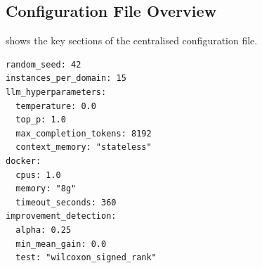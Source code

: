 \subsection{Configuration File Overview}

 shows the key sections of the centralised configuration file.

\begin{lstlisting}[language={}, caption={Key sections of \texttt{experiment\_config.yaml}. All experimental parameters are defined in this single file.}, label={lst:config_yaml}, basicstyle=\footnotesize\ttfamily, numbers=none, frame=single, xleftmargin=0.5cm, xrightmargin=0.5cm, breaklines=true]
random_seed: 42
instances_per_domain: 15
llm_hyperparameters:
  temperature: 0.0
  top_p: 1.0
  max_completion_tokens: 8192
  context_memory: "stateless"
docker:
  cpus: 1.0
  memory: "8g"
  timeout_seconds: 360
improvement_detection:
  alpha: 0.25
  min_mean_gain: 0.0
  test: "wilcoxon_signed_rank"
\end{lstlisting}
